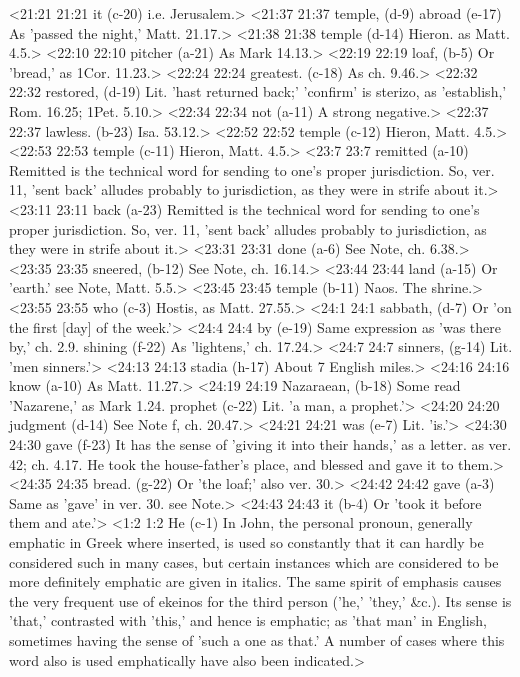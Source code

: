 <21:21 21:21  it (c-20)  i.e. Jerusalem.>
<21:37 21:37  temple, (d-9)  abroad (e-17)  As 'passed the night,' Matt. 21.17.>
<21:38 21:38  temple (d-14)  Hieron. as Matt. 4.5.>
<22:10 22:10  pitcher (a-21)  As Mark 14.13.>
<22:19 22:19  loaf, (b-5)  Or 'bread,' as 1Cor. 11.23.>
<22:24 22:24  greatest. (c-18)  As ch. 9.46.>
<22:32 22:32  restored, (d-19)  Lit. 'hast returned back;' 'confirm' is sterizo, as  'establish,' Rom. 16.25; 1Pet. 5.10.>
<22:34 22:34  not (a-11)  A strong negative.>
<22:37 22:37  lawless. (b-23)  Isa. 53.12.>
<22:52 22:52  temple (c-12)  Hieron, Matt. 4.5.>
<22:53 22:53  temple (c-11)  Hieron, Matt. 4.5.>
<23:7 23:7  remitted (a-10) Remitted is the technical word for sending to one's proper jurisdiction. So, ver. 11, 'sent back' alludes probably to jurisdiction, as they were in strife about it.>
<23:11 23:11  back (a-23)  Remitted is the technical word for sending to one's proper  jurisdiction. So, ver. 11, 'sent back' alludes probably to  jurisdiction, as they were in strife about it.>
<23:31 23:31  done (a-6)  See Note, ch. 6.38.>
<23:35 23:35  sneered, (b-12)  See Note, ch. 16.14.>
<23:44 23:44  land (a-15)  Or 'earth.' see Note, Matt. 5.5.>
<23:45 23:45  temple (b-11)  Naos. The shrine.>
<23:55 23:55  who (c-3)  Hostis, as Matt. 27.55.>
<24:1 24:1  sabbath, (d-7)  Or 'on the first [day] of the week.'>
<24:4 24:4  by (e-19)  Same expression as 'was there by,' ch. 2.9.
  shining (f-22)  As 'lightens,' ch. 17.24.>
<24:7 24:7  sinners, (g-14)  Lit. 'men sinners.'>
<24:13 24:13  stadia (h-17)  About 7 English miles.>
<24:16 24:16  know (a-10)  As Matt. 11.27.>
<24:19 24:19  Nazaraean, (b-18)  Some read 'Nazarene,' as Mark 1.24.
  prophet (c-22)  Lit. 'a man, a prophet.'>
<24:20 24:20  judgment (d-14)  See Note f, ch. 20.47.>
<24:21 24:21  was (e-7)  Lit. 'is.'>
<24:30 24:30  gave (f-23)  It has the sense of 'giving it into their hands,' as a  letter. as ver. 42; ch. 4.17. He took the house-father's place,  and blessed and gave it to them.>
<24:35 24:35  bread. (g-22)  Or 'the loaf;' also ver. 30.>
<24:42 24:42  gave (a-3)  Same as 'gave' in ver. 30. see Note.>
<24:43 24:43  it (b-4)  Or 'took it before them and ate.'>
<1:2 1:2  He (c-1)  In John, the personal pronoun, generally emphatic in Greek  where inserted, is used so constantly that it can hardly be  considered such in many cases, but certain instances which are  considered to be more definitely emphatic are given in italics.  The same spirit of emphasis causes the very frequent use of  ekeinos for the third person ('he,' 'they,' &c.). Its sense  is 'that,' contrasted with 'this,' and hence is emphatic; as  'that man' in English, sometimes having the sense of 'such a  one as that.' A number of cases where this word also is used  emphatically have also been indicated.>
